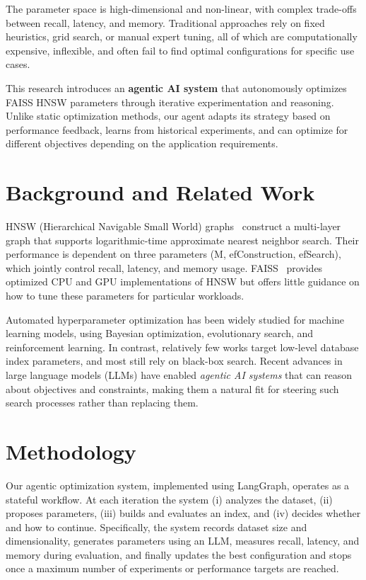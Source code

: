 \documentclass{article}
\begin{document}
The parameter space is high-dimensional and non-linear, with complex trade-offs between recall, latency, and memory. Traditional approaches rely on fixed heuristics, grid search, or manual expert tuning, all of which are computationally expensive, inflexible, and often fail to find optimal configurations for specific use cases.

This research introduces an \textbf{agentic AI system} that autonomously optimizes FAISS HNSW parameters through iterative experimentation and reasoning. Unlike static optimization methods, our agent adapts its strategy based on performance feedback, learns from historical experiments, and can optimize for different objectives depending on the application requirements.

\section{Background and Related Work}

HNSW (Hierarchical Navigable Small World) graphs~\cite{malkov2018efficientrobustapproximatenearest} construct a multi-layer
graph that supports logarithmic-time approximate nearest neighbor search. Their performance is dependent on three parameters (M, efConstruction, efSearch), which jointly control recall,
latency, and memory usage. FAISS~\cite{johnson2017billionscalesimilaritysearchgpus,faiss} provides optimized CPU and
GPU implementations of HNSW but offers little guidance on how to tune these parameters for
particular workloads.

Automated hyperparameter optimization has been widely studied for machine learning models, using
Bayesian optimization, evolutionary search, and reinforcement learning. In contrast, relatively
few works target low-level database index parameters, and most still rely on black-box search.
Recent advances in large language models (LLMs) have enabled \emph{agentic AI systems} that can
reason about objectives and constraints, making them a natural fit for steering such search
processes rather than replacing them.

\section{Methodology}

Our agentic optimization system, implemented using LangGraph, operates as a stateful workflow. At
each iteration the system (i) analyzes the dataset, (ii) proposes parameters, (iii) builds and
evaluates an index, and (iv) decides whether and how to continue. Specifically, the system records dataset size
and dimensionality, generates parameters using an LLM, measures recall, latency, and memory during evaluation, and finally updates the best configuration and stops
once a maximum number of experiments or performance targets are reached.
\end{document}
